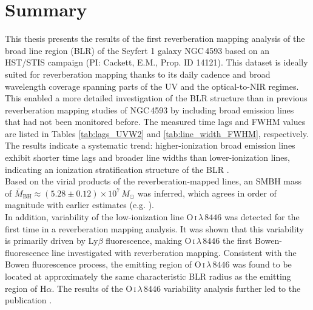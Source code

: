  
\section{Summary}

This thesis presents the results of the first reverberation mapping analysis of the broad line region (BLR) of the Seyfert 1 galaxy NGC\,4593 based on an HST/STIS campaign (PI: Cackett, E.M., Prop. ID 14121). This dataset is ideally suited for reverberation mapping thanks to its daily cadence and broad wavelength coverage spanning parts of the UV and the optical-to-NIR regimes. This enabled a more detailed investigation of the BLR structure than in previous reverberation mapping studies of NGC\,4593 by including broad emission lines that had not been monitored before. The measured time lags and FWHM values are listed in Tables \ref{tab:lags_UVW2} and \ref{tab:line_width_FWHM}, respectively. The results indicate a systematic trend: higher-ionization broad emission lines exhibit shorter time lags and broader line widths than lower-ionization lines, indicating an ionization stratification structure of the BLR \parencite{collin1988broad}.\\
Based on the virial products of the reverberation-mapped lines, an SMBH mass of $\bar{M}_{\mathrm{BH}} \approx (5.28 \pm 0.12)\times 10^{7}\,M_\odot$ was inferred, which agrees in order of magnitude with earlier estimates (e.g. \cite{kollatschny1997balmer, denney2006ngc4593}).\\
In addition, variability of the low-ionization line O\,\textsc{i}\,$\lambda\,8446$ was detected for the first time in a reverberation mapping analysis. It was shown that this variability is primarily driven by Ly$\beta$ fluorescence, making O\,\textsc{i}\,$\lambda\,8446$ the first Bowen-fluorescence line investigated with reverberation mapping. Consistent with the Bowen fluorescence process, the emitting region of O\,\textsc{i}\,$\lambda\,8446$ was found to be located at approximately the same characteristic BLR radius as the emitting region of H$\alpha$. The results of the O\,\textsc{i}\,$\lambda\,8446$ variability analysis further led to the publication \parencite{ochmann2026first}. 










